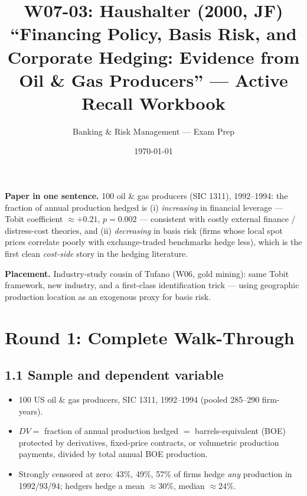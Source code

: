 \documentclass[11pt]{article}
\title{W07-03: Haushalter (2000, JF) \\
\large ``Financing Policy, Basis Risk, and Corporate Hedging: Evidence from Oil \& Gas Producers'' --- Active Recall Workbook}
\author{Banking \& Risk Management --- Exam Prep}
\date{\today}
\begin{document}
\maketitle

\begin{keybox}
\textbf{Paper in one sentence.} 100 oil \& gas producers (SIC 1311), 1992--1994: the fraction of annual production hedged is (i) \emph{increasing} in financial leverage --- Tobit coefficient $\approx +0.21$, $p=0.002$ --- consistent with costly external finance / distress-cost theories, and (ii) \emph{decreasing} in basis risk (firms whose local spot prices correlate poorly with exchange-traded benchmarks hedge less), which is the first clean \emph{cost-side} story in the hedging literature.

\textbf{Placement.} Industry-study cousin of Tufano (W06, gold mining): same Tobit framework, new industry, and a first-class identification trick --- using geographic production location as an exogenous proxy for basis risk.
\end{keybox}

\section*{Round 1: Complete Walk-Through}

\subsection*{1.1 Sample and dependent variable}
\begin{itemize}
\item 100 US oil \& gas producers, SIC 1311, 1992--1994 (pooled 285--290 firm-years).
\item $DV=$ fraction of annual production hedged $=$ barrels-equivalent (BOE) protected by derivatives, fixed-price contracts, or volumetric production payments, divided by total annual BOE production.
\item Strongly censored at zero: 43\%, 49\%, 57\% of firms hedge \emph{any} production in 1992/93/94; hedgers hedge a mean $\approx 30\%$, median $\approx 24\%$.
\end{itemize}
\end{document}
